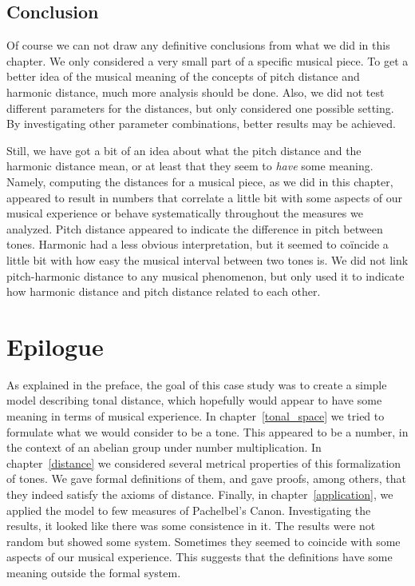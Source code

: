\documentclass[a4paper]{book}
\theoremstyle{definition}
\begin{document}
\section{Conclusion}
Of course we can not draw any definitive conclusions from what we did in this chapter.
We only considered a very small part of a specific musical piece.
To get a better idea of the musical meaning of the concepts of pitch distance and harmonic distance, much more analysis should be done.
Also, we did not test different parameters for the distances, but only considered one possible setting.
By investigating other parameter combinations, better results may be achieved.

Still, we have got a bit of an idea about what the pitch distance and the harmonic distance mean, or at least that they seem to \emph{have} some meaning.
Namely, computing the distances for a musical piece, as we did in this chapter, appeared to result in numbers that correlate a little bit with some aspects of our musical experience or behave systematically throughout the measures we analyzed.
Pitch distance appeared to indicate the difference in pitch between tones.
Harmonic had a less obvious interpretation, but it seemed to co\"incide a little bit with how easy the musical interval between two tones is.
We did not link pitch-harmonic distance to any musical phenomenon, but only used it to indicate how harmonic distance and pitch distance related to each other.

\chapter*{Epilogue}

As explained in the preface, the goal of this case study was to create a simple model describing tonal distance, which hopefully would appear to have some meaning in terms of musical experience.
In chapter~\ref{tonal_space} we tried to formulate what we would consider to be a tone.
This appeared to be a number, in the context of an abelian group under number multiplication.
In chapter~\ref{distance} we considered several metrical properties of this formalization of tones.
We gave formal definitions of them, and gave proofs, among others, that they indeed satisfy the axioms of distance.
Finally, in chapter~\ref{application}, we applied the model to few measures of Pachelbel's Canon.
Investigating the results, it looked like there was some consistence in it.
The results were not random but showed some system.
Sometimes they seemed to coincide with some aspects of our musical experience.
This suggests that the definitions have some meaning outside the formal system.
\end{document}
